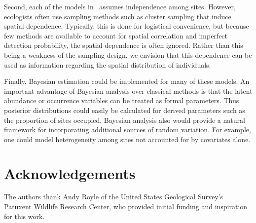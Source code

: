\documentclass[article,shortnames]{jss}
\newcommand{\um}{\pkg{unmarked}}
\begin{document}
Second, each of the models in \um\ assumes independence among sites. However, 
ecologists often use sampling methods such as cluster sampling that induce 
spatial dependence. Typically, this is done for logistical convenience, but 
because few methods are available to account for spatial correlation and 
imperfect detection probability, the spatial dependence is often ignored.  
Rather than this being a weakness of the sampling design, we envision that 
this dependence can be used as information regarding the spatial distribution
of individuals.  

Finally, Bayesian estimation could be implemented for many of these models.  An 
important advantage of Bayesian analysis over classical methods is that the 
latent abundance or occurrence variables can be treated as formal parameters.  
Thus posterior distributions could easily be calculated for derived parameters 
such as the proportion of sites occupied.  Bayesian analysis also would provide 
a natural framework for incorporating additional sources of random variation.  
For example, one could model heterogeneity among sites not accounted for by 
covariates alone.  

\section*{Acknowledgements}

The authors thank Andy Royle of the United States Geological Survey's
Patuxent Wildlife Research Center, who provided initial funding and
inspiration for this work.


\end{document}
